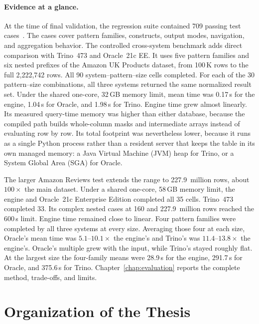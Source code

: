 \paragraph{Evidence at a glance.}
At the time of final validation, the regression suite contained 709 passing
test cases~\cite{monierashraf2025tests}.  The cases cover pattern families,
constructs, output modes, navigation, and aggregation behavior.  The
controlled cross-system benchmark adds direct comparison with Trino~473 and
Oracle~21c EE.  It uses five pattern families and six nested prefixes of the
Amazon UK Products dataset, from 100\,K rows to the full 2{,}222{,}742 rows.
All 90 system--pattern--size cells completed.  For each of the 30
pattern--size combinations, all three systems returned the same normalized
result set.  Under the shared one-core, 32\,GB memory limit, mean time was
0.17\,s for the engine, 1.04\,s for Oracle, and 1.98\,s for Trino.
Engine time grew almost linearly.  Its measured query-time memory was higher
than either database, because the compiled path builds whole-column masks and
intermediate arrays instead of evaluating row by row.  Its total footprint was
nevertheless lower, because it runs as a single Python process rather than a
resident server that keeps the table in its own managed memory: a Java
Virtual Machine (JVM) heap for Trino, or a System Global Area (SGA) for
Oracle.

The larger Amazon Reviews test extends the range to 227.9~million rows,
about $100\times$ the main dataset.  Under a shared one-core, 58\,GB
memory limit, the engine and Oracle~21c Enterprise Edition completed all
35 cells.  Trino~473 completed 33.  Its complex nested cases at 160 and
227.9~million rows reached the 600\,s limit.  Engine time remained close to linear.
Four pattern families were completed by all three systems at every size.
Averaging those four at each size, Oracle's mean time was
$5.1$--$10.1\times$ the engine's and Trino's was $11.4$--$13.8\times$ the
engine's.  Oracle's multiple grew with the input, while Trino's stayed
roughly flat.  At the largest size the
four-family means were 28.9\,s for the engine, 291.7\,s for Oracle, and
375.6\,s for Trino.
Chapter~\ref{chap:evaluation} reports the complete method, trade-offs, and
limits.

\section{Organization of the Thesis}
\label{sec:thesis-organization}

